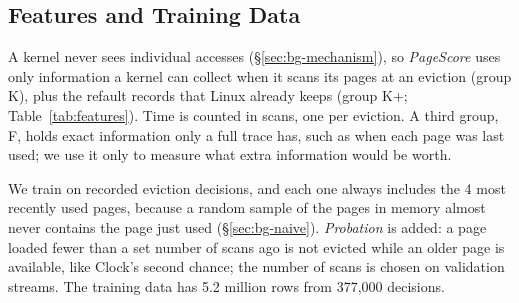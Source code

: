 \documentclass{article}
\newcommand{\clock}{Clock\xspace}
\DeclareRobustCommand{\pagescore}{\textit{PageScore}}
\newcommand{\tierF}{\textsf{F}\xspace}
\newcommand{\tierK}{\textsf{K}\xspace}
\newcommand{\tierKp}{\textsf{K+}\xspace}
\begin{document}
\subsection{Features and Training Data}
\label{sec:design-features}\label{sec:design-train}

A kernel never sees individual accesses (\S\ref{sec:bg-mechanism}), so \pagescore{} uses only information a kernel can collect when it scans its pages at an eviction (group \tierK), plus the refault records that Linux already keeps (group \tierKp; Table~\ref{tab:features}). Time is counted in scans, one per eviction. A third group, \tierF, holds exact information only a full trace has, such as when each page was last used; we use it only to measure what extra information would be worth.

We train on recorded eviction decisions, and each one always includes the 4 most recently used pages, because a random sample of the pages in memory almost never contains the page just used (\S\ref{sec:bg-naive}). \emph{Probation} is added: a page loaded fewer than a set number of scans ago is not evicted while an older page is available, like \clock's second chance; the number of scans is chosen on validation streams. The training data has 5.2 million rows from 377,000 decisions.
\end{document}
